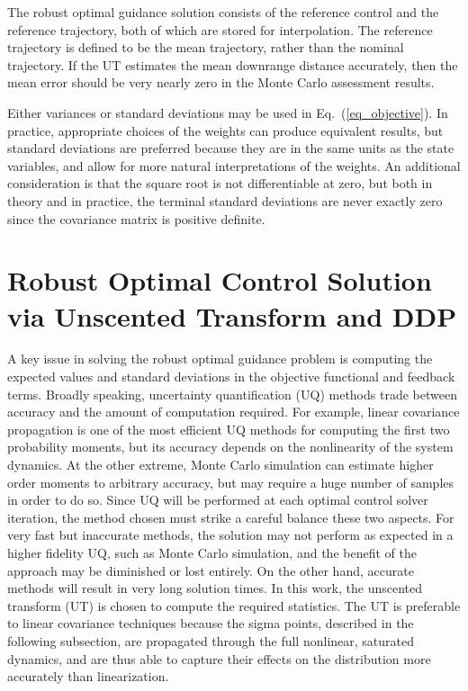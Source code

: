 \documentclass[journal ]{new-aiaa}
\begin{document}
The robust optimal guidance solution consists of the reference control and the reference trajectory, both of which are stored for interpolation. The reference trajectory is defined to be the mean trajectory, rather than the nominal trajectory. If the UT estimates the mean downrange distance accurately, then the mean error should be very nearly zero in the Monte Carlo assessment results. 

Either variances or standard deviations may be used in Eq.~(\ref{eq_objective}). In practice, appropriate choices of the weights can produce equivalent results, but standard deviations are preferred because they are in the same units as the state variables, and allow for more natural interpretations of the weights. An additional consideration is that the square root is not differentiable at zero, but both in theory and in practice, the terminal standard deviations are never exactly zero since the covariance matrix is positive definite.

\section*{Robust Optimal Control Solution via Unscented Transform and DDP}
A key issue in solving the robust optimal guidance problem is computing the expected values and standard deviations in the objective functional and feedback terms. Broadly speaking, uncertainty quantification (UQ) methods trade between accuracy and the amount of computation required. For example, linear covariance propagation is one of the most efficient UQ methods for computing the first two probability moments, but its accuracy depends on the nonlinearity of the system dynamics. At the other extreme, Monte Carlo simulation can estimate higher order moments to arbitrary accuracy, but may require a huge number of samples in order to do so. Since UQ will be performed at each optimal control solver iteration, the method chosen must strike a careful balance these two aspects. For very fast but inaccurate methods, the solution may not perform as expected in a higher fidelity UQ, such as Monte Carlo simulation, and the benefit of the approach may be diminished or lost entirely. On the other hand, accurate methods will result in very long solution times. In this work, the unscented transform (UT) \cite{UT1997} is chosen to compute the required statistics. The UT is preferable to linear covariance techniques because the sigma points, described in the following subsection, are propagated through the full nonlinear, saturated dynamics, and are thus able to capture their effects on the distribution more accurately than linearization. 
\end{document}

